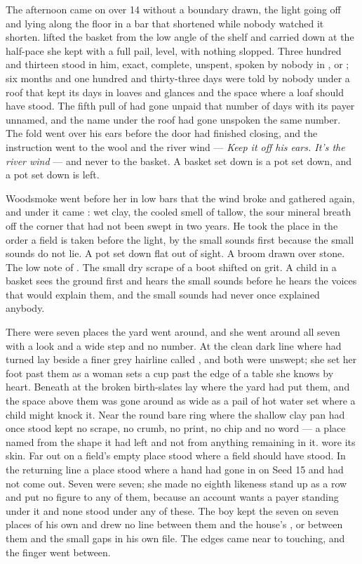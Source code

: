 The afternoon came on over  14 without a boundary drawn, the light going off  and lying along the floor in a bar that shortened while nobody watched it shorten.  lifted the basket from the low angle of the shelf and carried  down at the half-pace she kept with a full pail, level, with nothing slopped. Three hundred and thirteen stood in him, exact, complete, unspent, spoken by nobody in ,  or ; six months and one hundred and thirty-three days were told by nobody under a roof that kept its days in loaves and glances and the space where a loaf should have stood. The fifth pull of  had gone unpaid that number of days with its payer unnamed, and the name under the roof had gone unspoken the same number. The fold went over his ears before the door had finished closing, and the instruction went to the wool and the river wind --- \emph{Keep it off his ears. It's the river wind} --- and never to the basket. A basket set down is a pot set down, and a pot set down is left.

Woodsmoke went before her in low bars that the wind broke and gathered again, and under it came : wet clay, the cooled smell of tallow, the sour mineral breath off the corner that had not been swept in two years. He took the place in the order a field is taken before the light, by the small sounds first because the small sounds do not lie. A pot set down flat out of sight. A broom drawn over stone. The low note of . The small dry scrape of a boot shifted on grit. A child in a basket sees the ground first and hears the small sounds before he hears the voices that would explain them, and the small sounds had never once explained anybody.

There were seven places the yard went around, and she went around all seven with a look and a wide step and no number. At  the clean dark line where  had turned lay beside a finer grey hairline called , and both were unswept; she set her foot past them as a woman sets a cup past the edge of a table she knows by heart. Beneath  at  the broken birth-slates lay where the yard had put them, and the space above them was gone around as wide as a pail of hot water set where a child might knock it. Near  the round bare ring where the shallow clay pan had once stood kept no scrape, no crumb, no print, no chip and no word --- a place named from the shape it had left and not from anything remaining in it.  wore its skin. Far out on  a field's empty place stood where a field should have stood. In the returning line a place stood where a hand had gone in on Seed 15 and had not come out. Seven were seven; she made no eighth likeness stand up as a row and put no figure to any of them, because an account wants a payer standing under it and none stood under any of these. The boy kept the seven on seven places of his own and drew no line between them and the house's , or between them and the small gaps in his own file. The edges came near to touching, and the finger went between.

